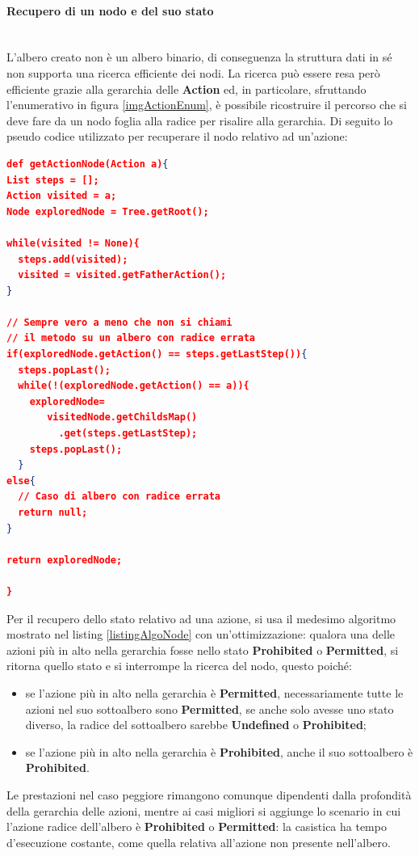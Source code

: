 \documentclass[12pt,a4paper,twoside]{book}
\begin{document}
\paragraph{Recupero di un nodo e del suo stato}\mbox{}\\
L'albero creato non è un albero binario, di conseguenza la struttura dati in sé non supporta una ricerca efficiente dei nodi. La ricerca può essere resa però efficiente grazie alla gerarchia delle \textbf{Action} ed, in particolare, sfruttando l'enumerativo in figura \ref{imgActionEnum}, è possibile ricostruire il percorso che si deve fare da un nodo foglia alla radice per risalire alla gerarchia. Di seguito lo pseudo codice utilizzato per recuperare il nodo relativo ad un'azione:

\begin{lstlisting}[language=Json,firstnumber=1,caption={Il caso peggiore per questa ricerca è la profondità della gerarchia delle azioni. Il caso migliore si ha qundo l'azione non è nell'albero, con tempo di risposta costante.},label=listingAlgoNode,captionpos=b]
def getActionNode(Action a){
List steps = [];
Action visited = a;
Node exploredNode = Tree.getRoot();

while(visited != None){
  steps.add(visited);
  visited = visited.getFatherAction();
}

// Sempre vero a meno che non si chiami
// il metodo su un albero con radice errata
if(exploredNode.getAction() == steps.getLastStep()){
  steps.popLast();
  while(!(exploredNode.getAction() == a)){
  	exploredNode=
  	   visitedNode.getChildsMap()
  	     .get(steps.getLastStep);
  	steps.popLast();
  }
else{
  // Caso di albero con radice errata
  return null; 
}

return exploredNode;
                
}
\end{lstlisting}
Per il recupero dello stato relativo ad una azione, si usa il medesimo algoritmo mostrato nel listing \ref{listingAlgoNode} con un'ottimizzazione: qualora una delle azioni più in alto nella gerarchia fosse nello stato \textbf{Prohibited} o \textbf{Permitted}, si ritorna quello stato e si interrompe la ricerca del nodo, questo poiché:
\begin{itemize}
\item se l'azione più in alto nella gerarchia è \textbf{Permitted}, necessariamente tutte le azioni nel suo sottoalbero sono \textbf{Permitted}, se anche solo avesse uno stato diverso, la radice del sottoalbero sarebbe \textbf{Undefined} o \textbf{Prohibited};
\item  se l'azione più in alto nella gerarchia è \textbf{Prohibited}, anche il suo sottoalbero è \textbf{Prohibited}.
\end{itemize}
Le prestazioni nel caso peggiore rimangono comunque dipendenti dalla profondità della gerarchia delle azioni, mentre ai casi migliori si aggiunge lo scenario in cui l'azione radice dell'albero è \textbf{Prohibited} o \textbf{Permitted}: la casistica ha tempo d'esecuzione costante, come quella relativa all'azione non presente nell'albero.
\end{document}
